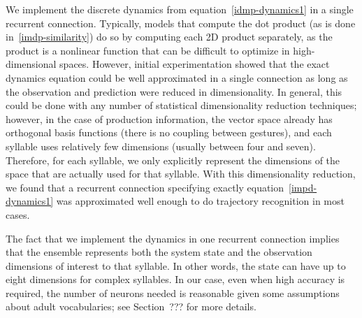 We implement the discrete dynamics
from equation~\eqref{idmp-dynamics1}
in a single recurrent connection.
Typically,
models that compute the dot product
(as is done in~\eqref{imdp-similarity})
do so by computing each 2D product separately,
as the product is a nonlinear function
that can be difficult to optimize
in high-dimensional spaces.
However, initial experimentation
showed that the exact dynamics equation
could be well approximated
in a single connection
as long as the observation
and prediction were reduced in dimensionality.
In general, this could be done
with any number of statistical dimensionality
reduction techniques;
however, in the case of production information,
the vector space already has
orthogonal basis functions
(there is no coupling between gestures),
and each syllable uses
relatively few dimensions
(usually between four and seven).
Therefore, for each syllable,
we only explicitly represent
the dimensions of the space
that are actually used for that syllable.
With this dimensionality reduction,
we found that a recurrent connection
specifying exactly equation~\eqref{impd-dynamics1}
was approximated well enough
to do trajectory recognition in most cases.

The fact that we implement the dynamics
in one recurrent connection
implies that the ensemble
represents both the system state
and the observation dimensions
of interest to that syllable.
In other words, the state can have
up to eight dimensions for complex syllables.
In our case,
even when high accuracy is required,
the number of neurons needed
is reasonable given some assumptions
about adult vocabularies;
see Section~??? for more details.

